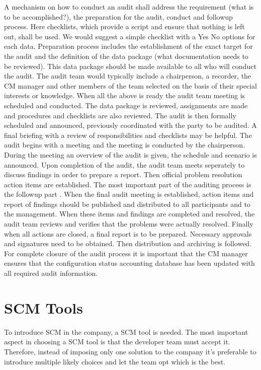 \documentclass[a4paper]{article}
\begin{document}
 A mechanism on how to conduct an audit shall address the requirement (what is to be accomplished?), the preparation for the audit, conduct and followup process. Here checklists, which provide a script and ensure that nothing is left out, shall be used. We would suggest a simple checklist with a Yes No options for each data. Preparation process includes the establishment of the exact target for the audit and the definition of the data package (what documentation needs to be reviewed). This data package should be made available to all who will conduct the audit. The audit team would typically include a chairperson, a recorder, the CM manager and other members of the team selected on the basis of their special interests or knowledge. When all the above is ready the audit team meeting is scheduled and conducted. The data package is reviewed, assignments are made and procedures and checklists are also reviewed. The audit is then formally scheduled and announced, previously coordinated with the party to be audited. A final briefing with a review of responsibilities and checklists may be helpful. The audit begins with a meeting and the meeting is conducted by the chairperson. During the meeting an overview of the audit is given, the schedule and scenario is announced. Upon completion of the audit, the audit team meets seperately to discuss findings in order to prepare a report. Then official problem resolution action items are established. The most important part of the auditing process is the followup part \cite{daniels}. When the final audit meeting is established, action items and report of findings should be published and distributed to all participants and to the management. When these items and findings are completed and resolved, the audit team reviews and verifies that the problems were actually resolved. Finally when all actions are closed, a final report is to be prepared. Necessary approvals and signatures need to be obtained. Then distribution and archiving is followed. For complete closure of the audit process it is important that the CM manager ensures that the configuration status accounting database has been updated with all required audit information.

\section{SCM Tools}

To introduce SCM in the company, a SCM tool is needed.
The most important aspect in choosing a SCM tool is that the developer team must accept it.
Therefore, instead of imposing only one solution to the company it's preferable to introduce multiple likely choices and let the team opt which is the best.
\end{document}
